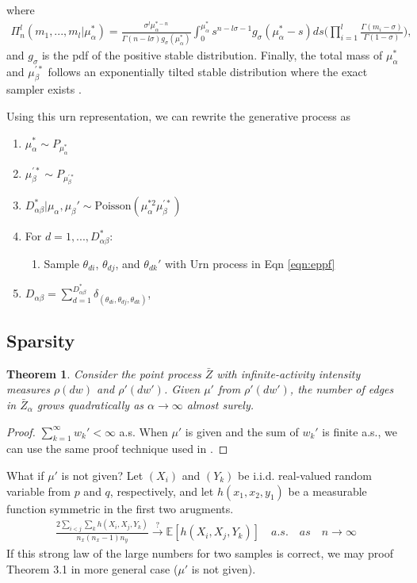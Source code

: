 \documentclass{article}
\newtheorem{theorem}{Theorem}[section]
\begin{document}
where
\begin{align}
\Pi_{n}^l(m_1, ..., m_l|\mu_\alpha^*) = \frac{\sigma^l \mu_\alpha^{*-n}}{\Gamma(n-l\sigma)g_{\sigma}(\mu_\alpha^*)} \int_{0}^{\mu_\alpha^*}s^{n-l\sigma-1}g_{\sigma}(\mu_\alpha^*-s)ds \bigg(\prod_{i=1}^{l} \frac{\Gamma(m_i-\sigma)}{\Gamma(1-\sigma)} \bigg),
\end{align}
and $g_\sigma$ is the pdf of the positive stable distribution.
Finally, the total mass of $\mu_\alpha^*$ and $\mu_\beta^{'*}$ follows an exponentially tilted stable distribution where the exact sampler exists \citep{devroye2009random,hofert2011sampling}. 

Using this urn representation, we can rewrite the generative process as
\begin{enumerate}
\item $\mu_\alpha^* \sim P_{\mu_\alpha^*}$
\item $\mu_\beta^{'*} \sim P_{\mu_\beta^{'*}}$
\item $D_{\alpha\beta}^* | \mu_\alpha, \mu_\beta' \sim \text{Poisson}(\mu_\alpha^{*2}\mu_\beta^{'*})$
\item For $d=1,...,D_{\alpha\beta}^*$:
\begin{enumerate}
\item Sample $\theta_{di}$, $\theta_{dj}$, and $\theta_{dk}'$ with Urn process in Eqn \ref{eqn:eppf}
\end{enumerate}
\item $D_{\alpha\beta} = \sum_{d=1}^{D_{\alpha\beta}^*} \delta_{(\theta_{di}, \theta_{dj}, \theta_{dk})}$,
\end{enumerate}

\subsection{Sparsity}

\begin{theorem} Consider the point process $\bar{Z}$ with infinite-activity intensity measures $\rho(dw)$ and $\rho'(dw')$. Given $\mu'$ from $\rho'(dw')$, the number of edges in $\bar{Z}_{\alpha}$ grows quadratically as $\alpha \rightarrow \infty$ almost surely.
\end{theorem}
\begin{proof}
$\sum_{k=1}^{\infty} w_k' < \infty$ a.s. When $\mu'$ is given and the sum of $w_k'$ is finite a.s., we can use the same proof technique used in \cite{Caron2015}.
\end{proof}
What if $\mu'$ is not given? Let $(X_i)$ and $(Y_k)$ be i.i.d. real-valued random variable from $p$ and $q$, respectively, and let $h(x_1, x_2, y_1)$ be a measurable function symmetric in the first two arugments. 
\begin{align}
\frac{2 \sum_{i<j}\sum_{k} h(X_i, X_j, Y_k)}{n_x(n_x -1) n_y} \xrightarrow[]{?} \mathbb{E}[h(X_i, X_j, Y_k)]\quad a.s.\quad as \quad n\rightarrow \infty
\end{align}
If this strong law of the large numbers for two samples is correct, we may proof Theorem 3.1 in more general case ($\mu'$ is not given).
\end{document}
